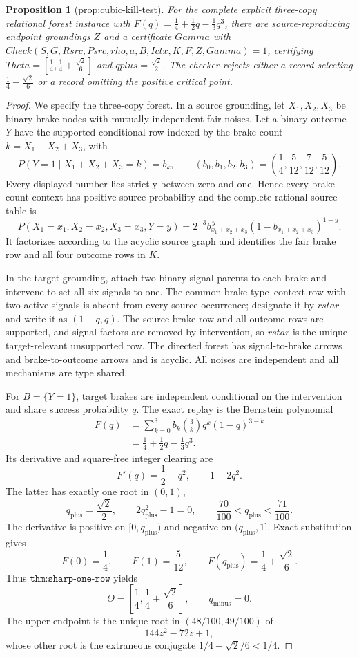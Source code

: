 \documentclass{article}
\newtheorem{proposition}{Proposition}
\begin{document}
\begin{proposition}[prop:cubic-kill-test]\label{prop:cubic-kill-test}
For the complete explicit three-copy relational forest instance with \(F(q)=\tfrac14+\tfrac12q-\tfrac13q^3\), there are source-reproducing endpoint groundings \(Z\) and a certificate \(Gamma\) with \(Check(S,G,Rsrc,Psrc,rho,a,B,Ictx,K,F,Z,Gamma)=1\), certifying \(Theta=[\tfrac14,\tfrac14+\tfrac{\sqrt2}{6}]\) and \(qplus=\tfrac{\sqrt2}{2}\). The checker rejects either a record selecting \(\tfrac14-\tfrac{\sqrt2}{6}\) or a record omitting the positive critical point.
\end{proposition}
\begin{proof}
We specify the three-copy forest.  In a source grounding, let \(X_1,X_2,X_3\) be binary brake nodes with mutually independent fair noises.  Let a binary outcome \(Y\) have the supported conditional row indexed by the brake count \(k=X_1+X_2+X_3\), with
\[
 P(Y=1\mid X_1+X_2+X_3=k)=b_k,
 \qquad
 (b_0,b_1,b_2,b_3)
 =\left(\frac14,\frac5{12},\frac7{12},\frac5{12}\right).
\]
Every displayed number lies strictly between zero and one.  Hence every brake-count context has positive source probability and the complete rational source table is
\[
 P(X_1=x_1,X_2=x_2,X_3=x_3,Y=y)
 =2^{-3}b_{x_1+x_2+x_3}^{\,y}
       (1-b_{x_1+x_2+x_3})^{1-y}.
\]
It factorizes according to the acyclic source graph and identifies the fair brake row and all four outcome rows in \(K\).

In the target grounding, attach two binary signal parents to each brake and intervene to set all six signals to one.  The common brake type--context row with two active signals is absent from every source occurrence; designate it by \(rstar\) and write it as \((1-q,q)\).  The source brake row and all outcome rows are supported, and signal factors are removed by intervention, so \(rstar\) is the unique target-relevant unsupported row.  The directed forest has signal-to-brake arrows and brake-to-outcome arrows and is acyclic.  All noises are independent and all mechanisms are type shared.

For \(B=\{Y=1\}\), target brakes are independent conditional on the intervention and share success probability \(q\).  The exact replay is the Bernstein polynomial
\[
 \begin{aligned}
 F(q)
 &=\sum_{k=0}^{3}b_k\binom3kq^k(1-q)^{3-k}\\
 &=\frac14+\frac12q-\frac13q^3.
 \end{aligned}
\]
Its derivative and square-free integer clearing are
\[
 F'(q)=\frac12-q^2,
 \qquad 1-2q^2.
\]
The latter has exactly one root in \((0,1)\),
\[
 q_{\mathrm{plus}}=\frac{\sqrt2}{2},
 \qquad 2q_{\mathrm{plus}}^2-1=0,
 \qquad \frac{70}{100}<q_{\mathrm{plus}}<\frac{71}{100}.
\]
The derivative is positive on \([0,q_{\mathrm{plus}})\) and negative on \((q_{\mathrm{plus}},1]\).  Exact substitution gives
\[
 F(0)=\frac14,
 \qquad F(1)=\frac5{12},
 \qquad F(q_{\mathrm{plus}})=\frac14+\frac{\sqrt2}{6}.
\]
Thus \(\texttt{thm:sharp-one-row}\) yields
\[
 \Theta=\left[\frac14,\frac14+\frac{\sqrt2}{6}\right],
 \qquad q_{\mathrm{minus}}=0.
\]
The upper endpoint is the unique root in \((48/100,49/100)\) of
\[
 144z^2-72z+1,
\]
whose other root is the extraneous conjugate \(1/4-\sqrt2/6<1/4\).


\end{proof}
\end{document}
